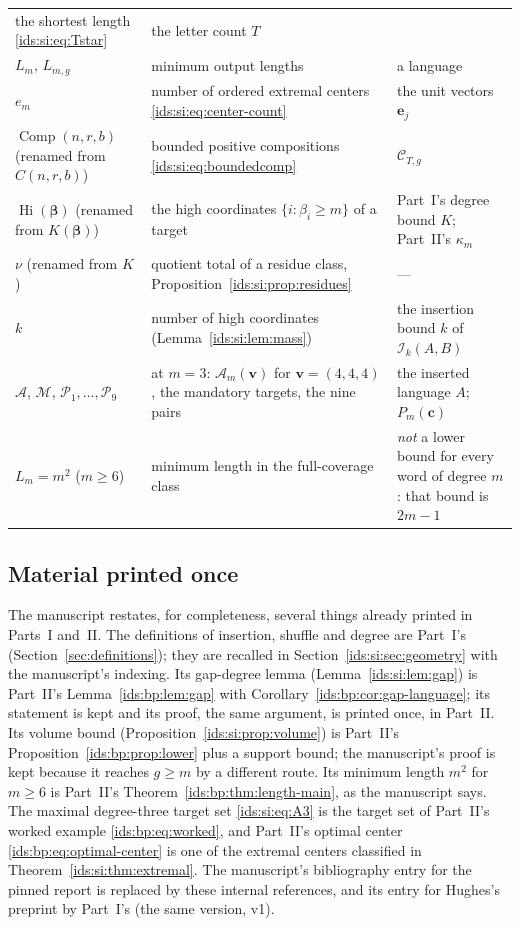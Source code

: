 \documentclass[11pt,letterpaper]{article}
\theoremstyle{definition}\newtheorem{definition}[theorem]{Definition}
\theoremstyle{remark}\newtheorem{remark}[theorem]{Remark}
\theoremstyle{definition}\newtheorem{question}[theorem]{Question}
\newcommand{\ins}[3]{\mathcal I_{#1}(#2,#3)}
\newcommand{\bpC}[2]{\mathcal C_{#1,#2}}
\newcommand{\Adm}[1]{\mathcal A_m(#1)}
\begin{document}
\begin{table}[htbp]
\begin{tabular}{>{\raggedright}p{.21\linewidth}>{\raggedright}p{.39\linewidth}>{\raggedright\arraybackslash}p{.32\linewidth}}
 the shortest length \eqref{ids:si:eq:Tstar} & the letter count $T$\\
$L_m$, $L_{m,g}$ & minimum output lengths & a language\\
$e_m$ & number of ordered extremal centers \eqref{ids:si:eq:center-count} &
 the unit vectors $\mathbf e_j$\\
$\operatorname{Comp}(n,r,b)$ (renamed from $C(n,r,b)$) & bounded positive
 compositions \eqref{ids:si:eq:boundedcomp} & $\bpC{T}{g}$\\
$\operatorname{Hi}(\boldsymbol\beta)$ (renamed from $K(\boldsymbol\beta)$) &
 the high coordinates $\{i:\beta_i\geq m\}$ of a target & Part~I's degree
 bound $K$; Part~II's $\kappa_m$\\
$\nu$ (renamed from $K$) & quotient total of a residue class,
 Proposition~\ref{ids:si:prop:residues} & ---\\
$k$ & number of high coordinates (Lemma~\ref{ids:si:lem:mass}) & the
 insertion bound $k$ of $\ins{k}{A}{B}$\\
$\mathcal A$, $\mathcal M$, $\mathcal P_1,\ldots,\mathcal P_9$ & at $m=3$:
 $\Adm{\mathbf v}$ for $\mathbf v=(4,4,4)$, the mandatory targets, the nine
 pairs & the inserted
 language $A$; $P_m(\mathbf c)$\\
$L_m=m^2$ ($m\geq6$) & minimum length in the full-coverage class & \emph{not}
 a lower bound for every word of degree $m$: that bound is $2m-1$\\
\bottomrule
\end{tabular}
\end{table}

\subsection{Material printed once}\label{ids:si:sec:imported}

The manuscript restates, for completeness, several things already printed in
Parts~I and~II. The definitions of insertion, shuffle and degree are Part~I's
(Section~\ref{sec:definitions}); they are recalled in
Section~\ref{ids:si:sec:geometry} with the manuscript's indexing. Its gap-degree
lemma (Lemma~\ref{ids:si:lem:gap}) is Part~II's
Lemma~\ref{ids:bp:lem:gap} with Corollary~\ref{ids:bp:cor:gap-language}; its
statement is kept and its proof, the same argument, is printed once, in
Part~II. Its volume bound (Proposition~\ref{ids:si:prop:volume}) is Part~II's
Proposition~\ref{ids:bp:prop:lower} plus a support bound; the manuscript's
proof is kept because it reaches $g\geq m$ by a different route. Its minimum
length $m^2$ for $m\geq6$ is Part~II's Theorem~\ref{ids:bp:thm:length-main},
as the manuscript says. The maximal degree-three target set
\eqref{ids:si:eq:A3} is the target set of Part~II's worked example
\eqref{ids:bp:eq:worked}, and Part~II's optimal center
\eqref{ids:bp:eq:optimal-center} is one of the extremal centers classified in
Theorem~\ref{ids:si:thm:extremal}. The manuscript's bibliography entry for
the pinned report is replaced by these internal references, and its entry for
Hughes's preprint by Part~I's (the same version, v1).
\end{document}
